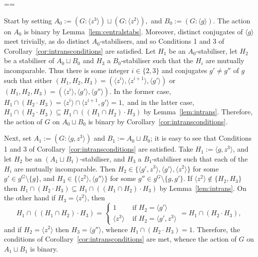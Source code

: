 \documentclass[11pt, a4paper]{amsart}
\makeatletter
\renewcommand{\proofname}{Proof}
\renewenvironment{proof}[1][\proofname]{\par
  \pushQED{\qed}  \normalfont \partopsep=\z@skip \topsep=\z@skip
  \trivlist
  \item[\hskip\labelsep
        \scshape
    #1\@addpunct{.}]\ignorespaces
}{  \popQED\endtrivlist\@endpefalse
}
\makeatother
\begin{document}
\begin{proof}
              
     Start by setting $A_0:=(G:\langle z^3\rangle)\sqcup(G:\langle z^2\rangle ),$ and $B_0:=(G:\langle g\rangle)$. The action on $A_0$ is binary by Lemma~\ref{lem:centralstabs}. Moreover, distinct conjugates of $\langle g\rangle$ meet trivially, as do distinct $A_0$-stabilisers, and so Conditions 1 and 3 of Corollary~\ref{cor:intransconditions} are satisfied. Let $H_1$ be an $A_0$-stabiliser, let $H_2$ be a stabiliser of $A_0\sqcup B_0$ and $H_3$ a $B_0$-stabiliser such that the $H_i$ are mutually incomparable. Thus there is some integer $i\in \{2,3\}$ and conjugates $g'\ne g''$ of $g$ such that either $(H_1,H_2,H_3)=(\langle z^i\rangle,\langle z^{i+1}\rangle,\langle g'\rangle)$ or $(H_1,H_2,H_3)=(\langle z^i\rangle,\langle g'\rangle,\langle g''\rangle)$. In the former case, $H_1\cap (H_2\cdot H_3)=\langle z^i\rangle\cap\langle z^{i+1},g'\rangle=1,$ and in the latter case, $H_1\cap (H_2\cdot H_3)\subseteq H_1\cap((H_1\cap H_2)\cdot H_3)$ by Lemma~\ref{lem:intrans}. Therefore, the action of $G$ on $A_0\sqcup B_0$ is binary by Corollary~\ref{cor:intransconditions}.

                                Next, set $A_1:=(G:\langle g,z^3\rangle)$ and $B_1:= A_0\sqcup B_0$; it is easy to see that Conditions 1 and 3 of Corollary~\ref{cor:intransconditions} are satisfied. Take $H_1:=\langle g,z^3\rangle$, and let $H_2$ be an $(A_1\sqcup B_1)$-stabiliser, and $H_3$ a $B_1$-stabiliser such that each of the $H_i$ are mutually incomparable. Then $H_2\in\{\langle g',z^3\rangle,\langle g'\rangle,\langle z^2\rangle\}$ for some $g'\in g^G\setminus\{g\}$, and $H_3\in\{\langle z^2\rangle,\langle g''\rangle\}$ for some $g''\in g^G\setminus\{g,g'\}$. If $\langle z^2\rangle\not\in \{H_2,H_3\}$ then $H_1\cap (H_2\cdot H_3)\subseteq H_1\cap((H_1\cap H_2)\cdot H_3)$ by Lemma~\ref{lem:intrans}. On the other hand if $H_3= \langle z^2\rangle$, then $$H_1\cap ((H_1\cap H_2)\cdot H_3)=\begin{cases}
         1&\text{ if $H_2=\langle g'\rangle$}\\
         \langle z^3\rangle&\text{ if $H_2=\langle g',z^3\rangle$}
     \end{cases}=H_1\cap (H_2\cdot H_3),$$ and if $H_2=\langle z^2\rangle$ then $H_3=\langle g''\rangle$, whence $H_1\cap (H_2\cdot H_3)=1$. Therefore, the conditions of Corollary~\ref{cor:intransconditions} are met, whence the action of $G$ on $A_1\sqcup B_1$ is binary.   
     

\end{proof}
\end{document}
